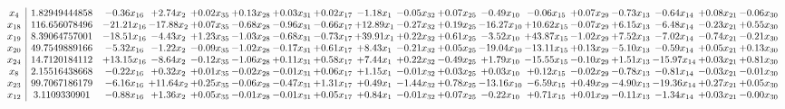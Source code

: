 \documentclass[9pt]{article}
\begin{document}
 \[\begin{array}{c| c c@{\hskip 2pt} c@{\hskip 2pt} c@{\hskip 2pt} c@{\hskip 2pt} c@{\hskip 2pt} c@{\hskip 2pt} c@{\hskip 2pt} c@{\hskip 2pt} c@{\hskip 2pt} c@{\hskip 2pt} c@{\hskip 2pt} c@{\hskip 2pt} c@{\hskip 2pt} c@{\hskip 2pt} c@{\hskip 2pt} c@{\hskip 2pt} }
 x_{4}   &  1.82949444858 & -0.36 x_{16} & +  2.74 x_{2} & +  0.02 x_{35} & +  0.13 x_{28} & +  0.03 x_{31} & +  0.02 x_{17} & -1.18 x_{1} & -0.05 x_{32} & +  0.07 x_{25} & -0.49 x_{10} & -0.06 x_{15} & +  0.07 x_{29} & -0.73 x_{13} & -0.64 x_{14} & +  0.08 x_{21} & -0.06 x_{30}\\
 x_{18}   &  116.656078496 & -21.21 x_{16} & -17.88 x_{2} & +  0.07 x_{35} & -0.68 x_{28} & -0.96 x_{31} & -0.66 x_{17} & + 12.89 x_{1} & -0.27 x_{32} & +  0.19 x_{25} & -16.27 x_{10} & + 10.62 x_{15} & -0.07 x_{29} & +  6.15 x_{13} & -6.48 x_{14} & -0.23 x_{21} & +  0.55 x_{30}\\
 x_{19}   &  8.39064757001 & -18.51 x_{16} & -4.43 x_{2} & +  1.23 x_{35} & -1.03 x_{28} & -0.68 x_{31} & -0.73 x_{17} & + 39.91 x_{1} & +  0.22 x_{32} & +  0.61 x_{25} & -3.52 x_{10} & + 43.87 x_{15} & -1.02 x_{29} & +  7.52 x_{13} & -7.02 x_{14} & -0.74 x_{21} & -0.21 x_{30}\\
 x_{20}   &  49.7549889166 & -5.32 x_{16} & -1.22 x_{2} & -0.09 x_{35} & -1.02 x_{28} & -0.17 x_{31} & +  0.61 x_{17} & +  8.43 x_{1} & -0.21 x_{32} & +  0.05 x_{25} & -19.04 x_{10} & -13.11 x_{15} & +  0.13 x_{29} & -5.10 x_{13} & -0.59 x_{14} & +  0.05 x_{21} & +  0.13 x_{30}\\
 x_{24}   &  14.7120184112 & + 13.15 x_{16} & -8.64 x_{2} & -0.12 x_{35} & -1.06 x_{28} & +  0.11 x_{31} & +  0.58 x_{17} & +  7.44 x_{1} & +  0.22 x_{32} & -0.49 x_{25} & +  1.79 x_{10} & -15.55 x_{15} & -0.10 x_{29} & +  1.51 x_{13} & -15.97 x_{14} & +  0.03 x_{21} & +  0.81 x_{30}\\
 x_{8}   &  2.15516438668 & -0.22 x_{16} & +  0.32 x_{2} & +  0.01 x_{35} & -0.02 x_{28} & -0.01 x_{31} & +  0.06 x_{17} & +  1.15 x_{1} & -0.01 x_{32} & +  0.03 x_{25} & +  0.03 x_{10} & +  0.12 x_{15} & -0.02 x_{29} & -0.78 x_{13} & -0.81 x_{14} & -0.03 x_{21} & -0.01 x_{30}\\
 x_{23}   &  99.7067186179 & -6.16 x_{16} & + 11.64 x_{2} & +  0.25 x_{35} & -0.06 x_{28} & -0.47 x_{31} & +  1.31 x_{17} & +  0.49 x_{1} & -1.44 x_{32} & +  0.78 x_{25} & -13.16 x_{10} & -6.59 x_{15} & +  0.49 x_{29} & -4.90 x_{13} & -19.36 x_{14} & +  0.27 x_{21} & +  0.05 x_{30}\\
 x_{12}   &  3.1109330901 & -0.88 x_{16} & +  1.36 x_{2} & +  0.05 x_{35} & -0.01 x_{28} & -0.01 x_{31} & +  0.05 x_{17} & +  0.84 x_{1} & -0.01 x_{32} & +  0.07 x_{25} & -0.22 x_{10} & +  0.71 x_{15} & +  0.01 x_{29} & -0.11 x_{13} & -1.34 x_{14} & +  0.03 x_{21} & -0.00 x_{30}\\

\end{array}\]
\end{document}
